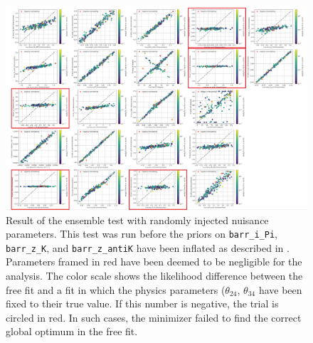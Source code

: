 \begin{figure}
    \centering
    \includegraphics{figures/measurement/sterile_analysis/param_selection/Screen Shot 2022-05-30 at 13.12.49.png}
    \caption{Result of the ensemble test with randomly injected nuisance parameters. This test was run before the priors on \texttt{barr\_i\_Pi}, \texttt{barr\_z\_K}, and \texttt{barr\_z\_antiK} have been inflated as described in . Parameters framed in red have been deemed to be negligible for the analysis. The color scale shows the likelihood difference between the free fit and a fit in which the physics parameters ($\theta_{24}$, $\theta_{34}$ have been fixed to their true value. If this number is negative, the trial is circled in red. In such cases, the minimizer failed to find the correct global optimum in the free fit.}
    \label{fig:parameter-ensemble-result}
\end{figure}

